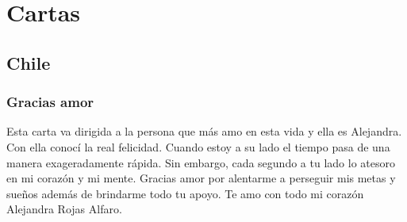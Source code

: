 \documentclass[10pt,letterpaper]{book}
\begin{document}
\chapter{Cartas}
\section{Chile}

\subsection{Gracias amor }
Esta carta va dirigida a la persona que más amo en esta vida y ella es Alejandra. Con ella conocí la real felicidad. Cuando estoy a su lado el tiempo pasa de una manera exageradamente rápida. Sin embargo, cada segundo a tu lado lo atesoro en mi corazón y mi mente. Gracias amor por alentarme a perseguir mis metas y sueños además de brindarme todo tu apoyo. Te amo con todo mi corazón Alejandra Rojas Alfaro.

\end{document}

